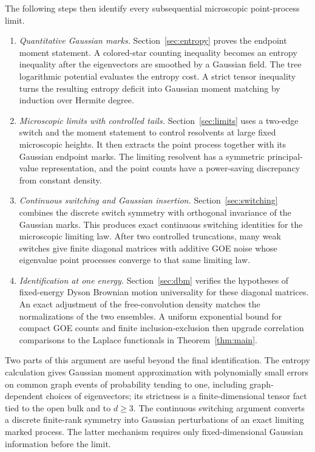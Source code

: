 The following steps then identify every subsequential microscopic
point-process limit.

\begin{enumerate}
\item \emph{Quantitative Gaussian marks.}
Section~\ref{sec:entropy} proves the endpoint moment statement.
A colored-star counting inequality becomes an entropy inequality after
the eigenvectors are smoothed by a Gaussian field.
The tree logarithmic potential evaluates the entropy cost.
A strict tensor inequality turns the resulting entropy deficit into
Gaussian moment matching by induction over Hermite degree.

\item \emph{Microscopic limits with controlled tails.}
Section~\ref{sec:limits} uses a two-edge switch and the moment statement
to control resolvents at large fixed microscopic heights.
It then extracts the point process together with its Gaussian endpoint
marks. The limiting resolvent has a symmetric principal-value
representation, and the point counts have a power-saving discrepancy
from constant density.

\item \emph{Continuous switching and Gaussian insertion.}
Section~\ref{sec:switching} combines the discrete switch symmetry with
orthogonal invariance of the Gaussian marks.
This produces exact continuous switching identities for the
microscopic limiting law.
After two controlled truncations, many weak switches give finite
diagonal matrices with additive GOE noise whose eigenvalue point
processes converge to that same limiting law.

\item \emph{Identification at one energy.}
Section~\ref{sec:dbm} verifies the hypotheses of fixed-energy Dyson
Brownian motion universality for these diagonal matrices.
An exact adjustment of the free-convolution density matches the
normalizations of the two ensembles.
A uniform exponential bound for compact GOE counts and finite
inclusion-exclusion then upgrade correlation comparisons to the
Laplace functionals in Theorem~\ref{thm:main}.
\end{enumerate}

Two parts of this argument are useful beyond the final identification.
The entropy calculation gives Gaussian moment approximation with
polynomially small errors on common graph events of probability tending
to one, including graph-dependent choices of eigenvectors; its strictness
is a finite-dimensional tensor fact tied
to the open bulk and to \(d\ge3\).
The continuous switching argument converts a discrete finite-rank
symmetry into Gaussian perturbations of an exact limiting marked
process. The latter mechanism requires only fixed-dimensional
Gaussian information before the limit.

